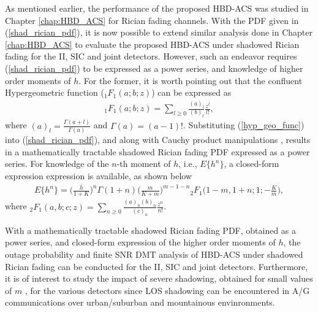 As mentioned earlier, the performance of the proposed HBD-ACS was studied in Chapter \ref{chap:HBD_ACS} for Rician fading channels. With the PDF given in (\ref{shad_rician_pdf}), it is now possible to extend similar analysis done in Chapter \ref{chap:HBD_ACS} to evaluate the proposed HBD-ACS under shadowed Rician fading for the II, SIC and joint detectors. However, such an endeavor requires (\ref{shad_rician_pdf}) to be expressed as a power series, and knowledge of higher order moments of $h$. For the former, it is worth pointing out that the confluent Hypergeometric function (${}_1{F_1}(a;b;z)$) can be expressed as \cite{parthasarathy2017coverage}
\begin{eqnarray}  \label{hyp_geo_func}
{}_1{F_1}(a;b;z) = \sum_{l\geq0} \frac{(a)_l}{(b)_l}\frac{z^l}{l!},
\end{eqnarray}
where $(a)_l = \frac{\Gamma(a+l)}{\Gamma(a)}$ and $\Gamma(a) = (a-1)!$. Substituting (\ref{hyp_geo_func}) into (\ref{shad_rician_pdf}), and along with Cauchy product manipulations \cite{bartoszewicz2012algebrability}, results in a mathematically tractable shadowed Rician fading PDF expressed as a power series. For knowledge of the $n$-th moment of $h$, i.e., $E\{h^n\}$, a closed-form expression expression is available, as shown below \cite{chun2017comprehensive}
\begin{eqnarray}
E\{h^n\} = \Bigg(\frac{\overline{h}}{1+K}\Bigg)^n \Gamma(1+n) \Bigg(\frac{m}{K+m}\Bigg)^{m-1-n} {}_2{F_1}\Bigg(1-m,1+n;1;-\frac{K}{m}\Bigg),
\end{eqnarray}
where ${}_2{F_1}(a,b;c;z) = \sum_{n\geq0} \frac{(a)_n (b)_n}{(c)_n} \frac{z^n}{n!}$.

With a mathematically tractable shadowed Rician fading PDF, obtained as a power series, and closed-form expression of the higher order moments of $h$, the outage probability and finite SNR DMT analysis of HBD-ACS under shadowed Rician fading can be conducted for the II, SIC and joint detectors. Furthermore, it is of interest to study the impact of severe shadowing, obtained for small values of $m$ \cite{chun2017comprehensive}, for the various detectors since LOS shadowing can be encountered in A/G communications over urban/suburban and mountainous envinronments.

